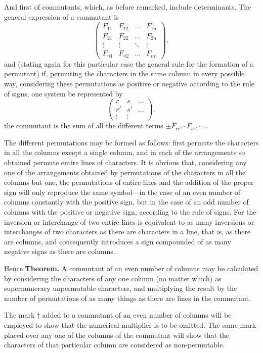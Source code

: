 \documentclass[11pt,a4paper]{book}
\begin{document}
And first of commutants, which, as before remarked, include determinants. The general expression of a commutant is
\[\begin{pmatrix} F_{11} & F_{12} & \ldots & F_{1n} \\ F_{21} & F_{22} & \ldots & F_{2n} \\ \vdots & \vdots & \ddots & \vdots \\ F_{n1} & F_{n2} & \ldots & F_{nn} \end{pmatrix},\]
and (stating again for this particular case the general rule for the formation of a permutant) if, permuting the characters in the same column in every possible way, considering these permutations as positive or negative according to the rule of signs, one system be represented by
\[\begin{pmatrix} r & s & \ldots \\ r' & s' & \ldots \\ \vdots & \vdots \end{pmatrix},\]
the commutant is the sum of all the different terms $\pm F_{rr'} \cdot F_{ss'} \cdot \ldots$

The different permutations may be formed as follows: first permute the characters in all the columns except a single column, and in each of the arrangements so obtained permute entire lines of characters. It is obvious that, considering any one of the arrangements obtained by permutations of the characters in all the columns but one, the permutations of entire lines and the addition of the proper sign will only reproduce the same symbol---in the case of an even number of columns constantly with the positive sign, but in the case of an odd number of columns with the positive or negative sign, according to the rule of signs. For the inversion or interchange of two entire lines is equivalent to as many inversions or interchanges of two characters as there are characters in a line, that is, as there are columns, and consequently introduces a sign compounded of as many negative signs as there are columns.

Hence \textbf{Theorem.} A commutant of an even number of columns may be calculated by considering the characters of any one column (no matter which) as supernumerary unpermutable characters, and multiplying the result by the number of permutations of as many things as there are lines in the commutant.

The mark $\dagger$ added to a commutant of an even number of columns will be employed to show that the numerical multiplier is to be omitted. The same mark placed over any one of the columns of the commutant will show that the characters of that particular column are considered as non-permutable.
\end{document}
